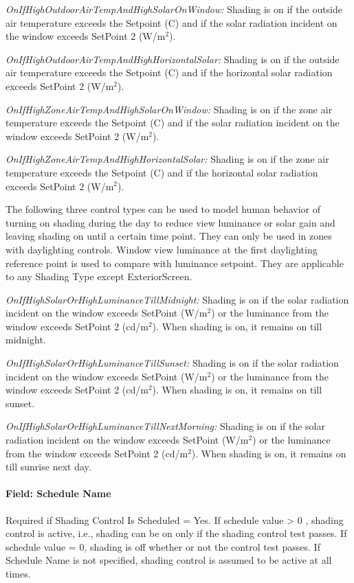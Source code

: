 \emph{OnIfHighOutdoorAirTempAndHighSolarOnWindow:} Shading is on if the outside air temperature exceeds the Setpoint (C) and if the solar radiation incident on the window exceeds SetPoint 2 (W/m\(^{2}\)).

\emph{OnIfHighOutdoorAirTempAndHighHorizontalSolar:} Shading is on if the outside air temperature exceeds the Setpoint (C) and if the horizontal solar radiation exceeds SetPoint 2 (W/m\(^{2}\)).

\emph{OnIfHighZoneAirTempAndHighSolarOnWindow:} Shading is on if the zone air temperature exceeds the Setpoint (C) and if the solar radiation incident on the window exceeds SetPoint 2 (W/m\(^{2}\)).

\emph{OnIfHighZoneAirTempAndHighHorizontalSolar:} Shading is on if the zone air temperature exceeds the Setpoint (C) and if the horizontal solar radiation exceeds SetPoint 2 (W/m\(^{2}\)).

The following three control types can be used to model human behavior of turning on shading during the day to reduce view luminance or solar gain and leaving shading on until a certain time point. They can only be used in zones with daylighting controls. Window view luminance at the first daylighting reference point is used to compare with luminance setpoint. They are applicable to any Shading Type except ExteriorScreen.

\emph{OnIfHighSolarOrHighLuminanceTillMidnight:} Shading is on if the solar radiation incident on the window exceeds SetPoint (W/m\(^{2}\)) or the luminance from the window exceeds SetPoint 2 (cd/m\(^{2}\)). When shading is on, it remains on till midnight.

\emph{OnIfHighSolarOrHighLuminanceTillSunset:} Shading is on if the solar radiation incident on the window exceeds SetPoint (W/m\(^{2}\)) or the luminance from the window exceeds SetPoint 2 (cd/m\(^{2}\)). When shading is on, it remains on till sunset.

\emph{OnIfHighSolarOrHighLuminanceTillNextMorning:} Shading is on if the solar radiation incident on the window exceeds SetPoint (W/m\(^{2}\)) or the luminance from the window exceeds SetPoint 2 (cd/m\(^{2}\)). When shading is on, it remains on till sunrise next day.


\paragraph{Field: Schedule Name}\label{field-schedule-name-007}

Required if Shading Control Is Scheduled = Yes. If schedule value \textgreater{} 0 , shading control is active, i.e., shading can be on only if the shading control test passes. If schedule value = 0, shading is off whether or not the control test passes. If Schedule Name is not specified, shading control is assumed to be active at all times.

